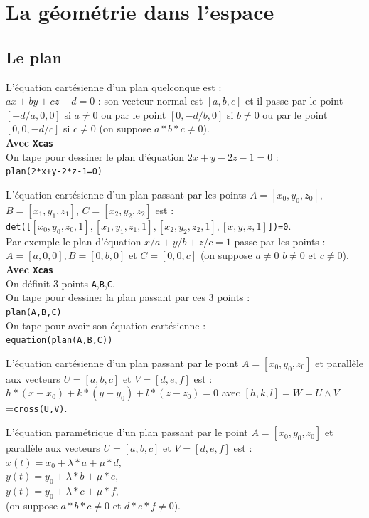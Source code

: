 \documentclass[a4paper,11pt]{book}
\begin{document}
\chapter{La g\'eom\'etrie dans l'espace}
\section{Le plan}
L'\'equation cart\'esienne d'un plan quelconque est :\\
$ax+by+cz+d=0$ : son vecteur normal est $[a,b,c]$ et il passe par le point 
$[-d/a,0,0]$ si $a\neq 0$ ou par le point $[0,-d/b,0]$ si $b\neq 0$ ou par le 
point $[0,0,-d/c]$ si $c\neq 0$ (on suppose $a*b*c \neq 0$).\\
{\bf Avec {\tt Xcas}}\\
On tape pour dessiner le plan d'\'equation $2x+y-2z-1=0$ :\\
{\tt plan(2*x+y-2*z-1=0)}

L'\'equation cart\'esienne d'un plan passant par les points $A=[x_0,y_0,z_0]$,
$B=[x_1,y_1,z_1]$, $C=[x_2,y_2,z_2]$ est :\\
{\tt det([$[x_0,y_0,z_0,1],[x_1,y_1,z_1,1],[x_2,y_2,z_2,1],[x,y,z,1]$])=0}.\\
Par exemple le plan d'\'equation $x/a+y/b+z/c=1$ passe par les points :\\
$A=[a,0,0],B=[0,b,0]$ et $C=[0,0,c]$ (on suppose $a \neq 0$ $b \neq 0$ et
$c \neq 0$).\\
{\bf Avec {\tt Xcas}}\\
On d\'efinit 3 points {\tt A},{\tt B},{\tt C}.\\
On tape pour dessiner la plan passant par ces 3 points :\\
{\tt plan(A,B,C)}\\
On tape pour avoir son \'equation cart\'esienne :\\
{\tt equation(plan(A,B,C))}

L'\'equation cart\'esienne d'un plan passant par le point $A=[x_0,y_0,z_0]$ et
parall\`ele aux vecteurs $U=[a,b,c]$ et $V=[d,e,f]$ est :\\
$h*(x-x_0)+k*(y-y_0)+l*(z-z_0)=0$ avec $[h,k,l]=W=U\wedge V$={\tt cross(U,V)}.

L'\'equation param\'etrique d'un plan passant par le point $A=[x_0,y_0,z_0]$ et
parall\`ele aux vecteurs $U=[a,b,c]$ et $V=[d,e,f]$ est :\\
$x(t)=x_0+\lambda*a+\mu*d,$\\
$y(t)=y_0+\lambda*b+\mu*e,$\\
$y(t)=y_0+\lambda*c+\mu*f,$\\ (on suppose $a*b*c \neq 0$ et $d*e*f \neq 0$).\\
\end{document}
